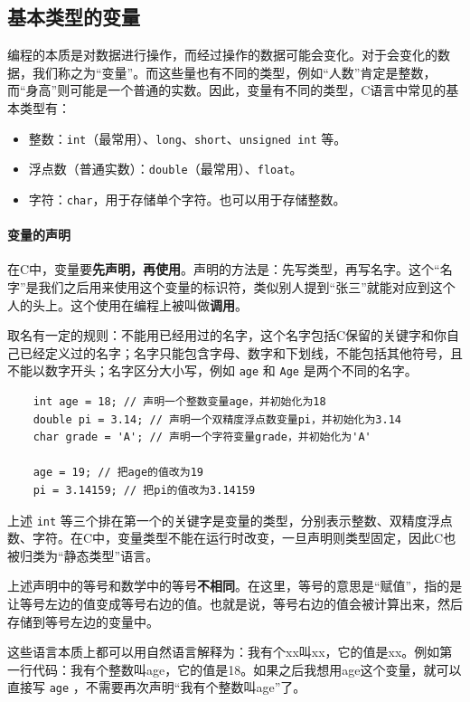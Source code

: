 \subsection{基本类型的变量}

编程的本质是对数据进行操作，而经过操作的数据可能会变化。对于会变化的数据，我们称之为“变量”。而这些量也有不同的类型，例如“人数”肯定是整数，而“身高”则可能是一个普通的实数。因此，变量有不同的类型，C语言中常见的基本类型有：
\begin{itemize}
    \item 整数：\texttt{int}（最常用）、\texttt{long}、\texttt{short}、\texttt{unsigned int} 等。
    \item 浮点数（普通实数）：\texttt{double}（最常用）、\texttt{float}。
    \item 字符：\texttt{char}，用于存储单个字符。也可以用于存储整数。
\end{itemize}

\paragraph{变量的声明}
在C中，变量要\textbf{先声明，再使用}。声明的方法是：先写类型，再写名字。这个“名字”是我们之后用来使用这个变量的标识符，类似别人提到“张三”就能对应到这个人的头上。这个使用在编程上被叫做\textbf{调用}。

取名有一定的规则：不能用已经用过的名字，这个名字包括C保留的关键字和你自己已经定义过的名字；名字只能包含字母、数字和下划线，不能包括其他符号，且不能以数字开头；名字区分大小写，例如 \texttt{age} 和 \texttt{Age} 是两个不同的名字。
\begin{verbatim}
    int age = 18; // 声明一个整数变量age，并初始化为18
    double pi = 3.14; // 声明一个双精度浮点数变量pi，并初始化为3.14
    char grade = 'A'; // 声明一个字符变量grade，并初始化为'A'

    age = 19; // 把age的值改为19
    pi = 3.14159; // 把pi的值改为3.14159
\end{verbatim}

上述 \texttt{int} 等三个排在第一个的关键字是变量的类型，分别表示整数、双精度浮点数、字符。在C中，变量类型不能在运行时改变，一旦声明则类型固定，因此C也被归类为“静态类型”语言。

上述声明中的等号和数学中的等号\textbf{不相同}。在这里，等号的意思是“赋值”，指的是让等号左边的值变成等号右边的值。也就是说，等号右边的值会被计算出来，然后存储到等号左边的变量中。

这些语言本质上都可以用自然语言解释为：我有个xx叫xx，它的值是xx。例如第一行代码：我有个整数叫age，它的值是18。如果之后我想用age这个变量，就可以直接写 \verb|age| ，不需要再次声明“我有个整数叫age”了。

